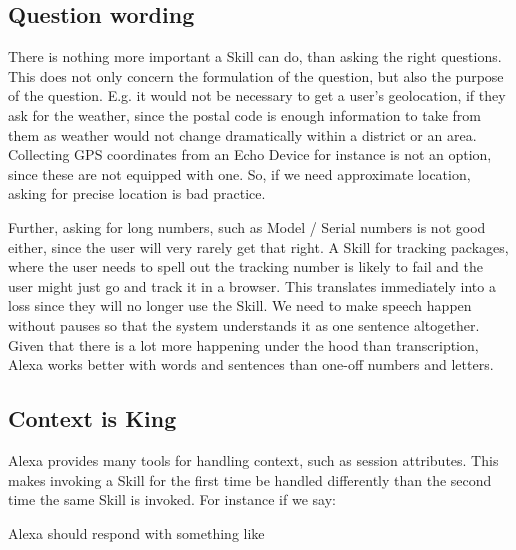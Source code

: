 \subsection*{Question wording}
There is nothing more important a Skill can do, than asking the right questions. This does not only concern the formulation of the question, but also the purpose of the question. E.g. it would not be necessary to get a user's geolocation, if they ask for the weather, since the postal code is enough information to take from them as weather would not change dramatically within a district or an area. Collecting GPS coordinates from an Echo Device for instance is not an option, since these are not equipped with one. So, if we need approximate location, asking for precise location is bad practice.

Further, asking for long numbers, such as Model / Serial numbers is not good either, since the user will very rarely get that right. A Skill for tracking packages, where the user needs to spell out the tracking number is likely to fail and the user might just go and track it in a browser. This translates immediately into a loss since they will no longer use the Skill. We need to make speech happen without pauses so that the system understands it as one sentence altogether. Given that there is a lot more happening under the hood than transcription, Alexa works better with words and sentences than one-off numbers and letters. 

\subsection*{Context is King}
Alexa provides many tools for handling context, such as session attributes. This makes invoking a Skill for the first time be handled differently than the second time the same Skill is invoked. For instance if we say:




\noindent Alexa should respond with something like

\begin{flushright}
\end{flushright}

